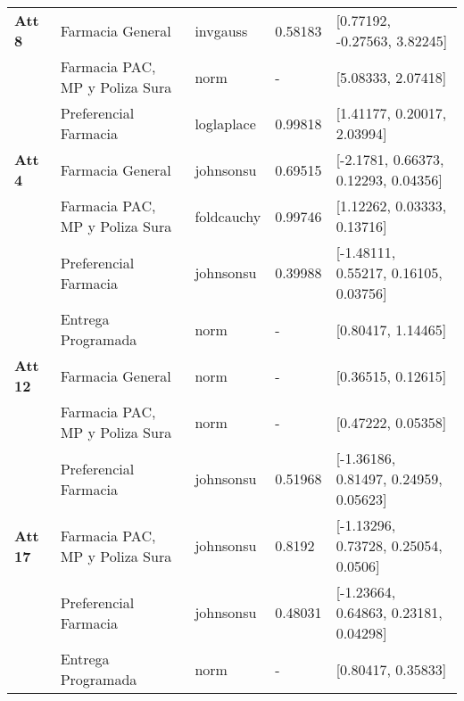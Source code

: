 \begin{longtable}[c]{lp{3cm}llp{5cm}}
\textbf{Att 8}  & Farmacia General                         & invgauss     & 0.58183 & {[}0.77192, -0.27563, 3.82245{]}                                                         \\
       & Farmacia PAC, MP y Poliza Sura           & norm         & -       & {[}5.08333, 2.07418{]}                                                                   \\
       & Preferencial Farmacia                    & loglaplace   & 0.99818 & {[}1.41177, 0.20017, 2.03994{]}                                                          \\ \hline
\textbf{Att 4}  & Farmacia General                         & johnsonsu    & 0.69515 & {[}-2.1781, 0.66373, 0.12293, 0.04356{]}                                                 \\
       & Farmacia PAC, MP y Poliza Sura           & foldcauchy   & 0.99746 & {[}1.12262, 0.03333, 0.13716{]}                                                          \\
       & Preferencial Farmacia                    & johnsonsu    & 0.39988 & {[}-1.48111, 0.55217, 0.16105, 0.03756{]}                                                \\
       & Entrega Programada                       & norm         & -       & {[}0.80417, 1.14465{]}                                                                   \\ \hline
\textbf{Att 12} & Farmacia General                         & norm         & -       & {[}0.36515, 0.12615{]}                                                                   \\
       & Farmacia PAC, MP y Poliza Sura           & norm         & -       & {[}0.47222, 0.05358{]}                                                                   \\
       & Preferencial Farmacia                    & johnsonsu    & 0.51968 & {[}-1.36186, 0.81497, 0.24959, 0.05623{]}                                                \\ \hline
\textbf{Att 17} & Farmacia PAC, MP y Poliza Sura           & johnsonsu    & 0.8192  & {[}-1.13296, 0.73728, 0.25054, 0.0506{]}                                                 \\
       & Preferencial Farmacia                    & johnsonsu    & 0.48031 & {[}-1.23664, 0.64863, 0.23181, 0.04298{]}                                                \\
       & Entrega Programada                       & norm         & -       & {[}0.80417, 0.35833{]}                                                                   \\ \hline

\end{longtable}
